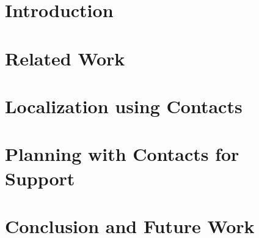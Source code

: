 \documentclass[hidelinks, 12pt]{cmuthesis}
\begin{document}
\chapter{Introduction}


\chapter{Related Work}


\chapter{Localization using Contacts}


\chapter{Planning with Contacts for Support}


\chapter{Conclusion and Future Work}


%

\backmatter


\renewcommand{\bibsection}{\chapter{\bibname}}

\nocite{*}
\end{document}
